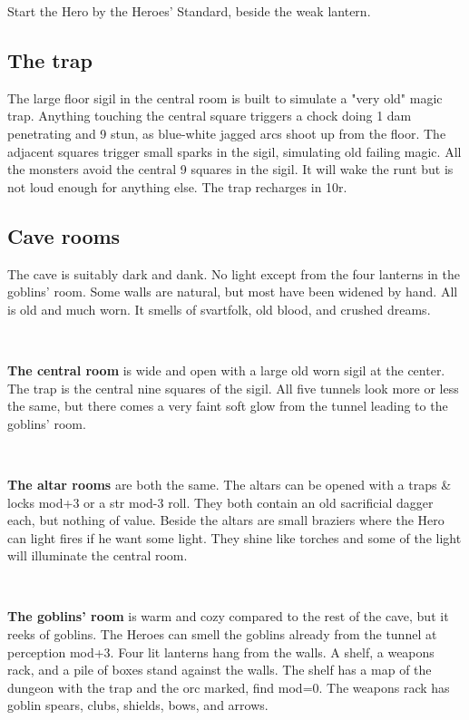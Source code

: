 Start the Hero by the Heroes' Standard, beside the weak lantern.


\subsection*{The trap}

The large floor sigil in the central room is built to simulate a "very old" magic trap. Anything touching the central square triggers a chock doing 1 dam penetrating and 9 stun, as blue-white jagged arcs shoot up from the floor. The adjacent squares trigger small sparks in the sigil, simulating old failing magic. All the monsters avoid the central 9 squares in the sigil. It will wake the runt but is not loud enough for anything else. The trap recharges in 10r.


\subsection*{Cave rooms}

The cave is suitably dark and dank. No light except from the four lanterns in the goblins' room. Some walls are natural, but most have been widened by hand. All is old and much worn. It smells of svartfolk, old blood, and crushed dreams.

\

\textbf{The central room} is wide and open with a large old worn sigil at the center. The trap is the central nine squares of the sigil. All five tunnels look more or less the same, but there comes a very faint soft glow from the tunnel leading to the goblins' room.

\

\textbf{The altar rooms} are both the same. The altars can be opened with a traps \& locks mod+3 or a str mod-3 roll. They both contain an old sacrificial dagger each, but nothing of value. Beside the altars are small braziers where the Hero can light fires if he want some light. They shine like torches and some of the light will illuminate the central room.

\

\textbf{The goblins' room} is warm and cozy compared to the rest of the cave, but it reeks of goblins. The Heroes can smell the goblins already from the tunnel at perception mod+3. Four lit lanterns hang from the walls. A shelf, a weapons rack, and a pile of boxes stand against the walls. The shelf has a map of the dungeon with the trap and the orc marked, find mod=0. The weapons rack has goblin spears, clubs, shields, bows, and arrows.


